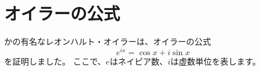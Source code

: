 \documentclass{ltjsarticle}
\begin{document}
\section{オイラーの公式}
かの有名なレオンハルト・オイラーは、オイラーの公式
\[e^{ix} = \cos{x} + i\sin{x}\]
を証明しました。
ここで、$e$はネイピア数、$i$は虚数単位を表します。
\end{document}
